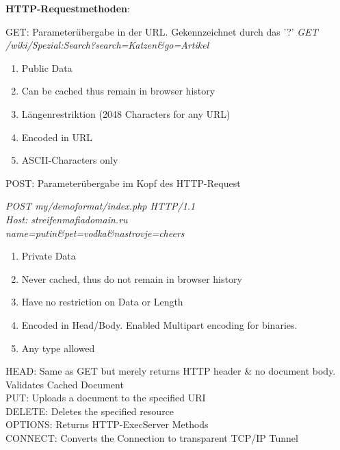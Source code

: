 \documentclass[11pt]{article}
\begin{document}
\begin{enumerate}[\thesection .1]
\begin{enumerate}[$\diamond$]
        \textbf{HTTP-Requestmethoden}:
        \begin{addmargin}[1em]{1em}
            GET: Parameterübergabe in der URL. Gekennzeichnet durch das '?'
            \emph{GET /wiki/Spezial:Search?search=Katzen\&go=Artikel}
            \begin{enumerate}[$\diamond$]
                \item Public Data
                \item Can be cached thus remain in browser history
                \item Längenrestriktion (2048 Characters for any URL)
                \item Encoded in URL
                \item ASCII-Characters only
            \end{enumerate}
        \end{addmargin}
        POST: Parameterübergabe im Kopf des HTTP-Request
        \begin{addmargin}[1em]{1em}
            \emph{POST my/demoformat/index.php HTTP/1.1\\
            Host: streifenmafiadomain.ru\\
            name=putin\&pet=vodka\&nastrovje=cheers}
            \begin{enumerate}[$\diamond$]
                \item Private Data
                \item Never cached, thus do not remain in browser history
                \item Have no restriction on Data or Length
                \item Encoded in Head/Body. Enabled Multipart encoding for binaries.
                \item Any type allowed
            \end{enumerate}
        \end{addmargin}
        HEAD: Same as GET but merely returns HTTP header \& no document body. Validates Cached Document\\
        PUT: Uploads a document to the specified URI\\
        DELETE: Deletes the specified resource\\
        OPTIONS: Returns HTTP-ExecServer Methods\\
        CONNECT: Converts the Connection to transparent TCP/IP Tunnel\\
    \end{enumerate}


\end{enumerate}
\end{document}
